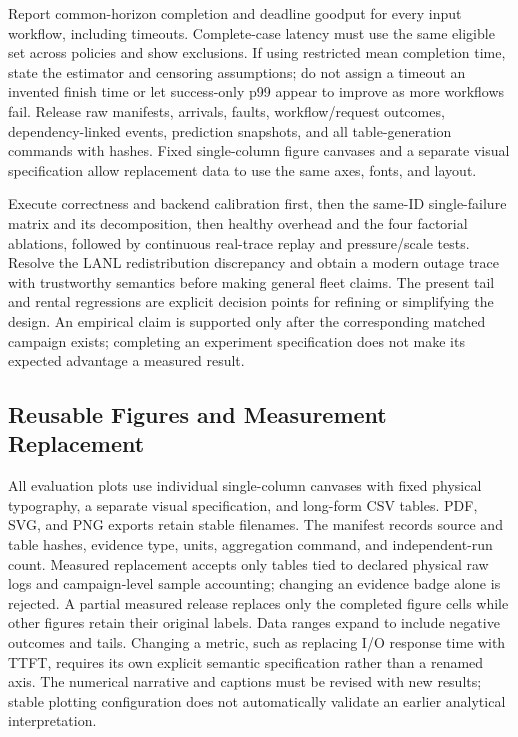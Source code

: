 \documentclass[sigplan,10pt,anonymous,nonacm]{acmart}
\begin{document}
Report common-horizon completion and deadline goodput for every input
workflow, including timeouts. Complete-case latency must use the same
eligible set across policies and show exclusions. If using restricted
mean completion time, state the estimator and censoring assumptions;
do not assign a timeout an invented finish time or let success-only
p99 appear to improve as more workflows fail. Release raw manifests,
arrivals, faults, workflow/request outcomes, dependency-linked events,
prediction snapshots, and all table-generation commands with hashes.
Fixed single-column figure canvases and a separate visual specification
allow replacement data to use the same axes, fonts, and layout.

Execute correctness and backend calibration first, then the same-ID
single-failure matrix and its decomposition, then healthy overhead and
the four factorial ablations, followed by continuous real-trace replay
and pressure/scale tests. Resolve the LANL redistribution discrepancy
and obtain a modern outage trace with trustworthy semantics before
making general fleet claims. The present tail and rental regressions
are explicit decision points for refining or simplifying the design.
An empirical claim is supported only after the corresponding matched
campaign exists; completing an experiment specification does not make
its expected advantage a measured result.

\FloatBarrier
\subsection{Reusable Figures and Measurement Replacement}

All evaluation plots use individual single-column canvases with fixed
physical typography, a separate visual specification, and long-form CSV
tables. PDF, SVG, and PNG exports retain stable filenames. The manifest
records source and table hashes, evidence type, units, aggregation command,
and independent-run count. Measured replacement accepts only tables tied
to declared physical raw logs and campaign-level sample accounting;
changing an evidence badge alone is rejected. A partial measured release
replaces only the completed figure cells while other figures retain their
original labels. Data ranges expand to include negative outcomes and
tails. Changing a metric, such as replacing I/O response time with TTFT,
requires its own explicit semantic specification rather than a renamed
axis. The numerical narrative and captions must be revised with new
results; stable plotting configuration does not automatically validate
an earlier analytical interpretation.
\end{document}

